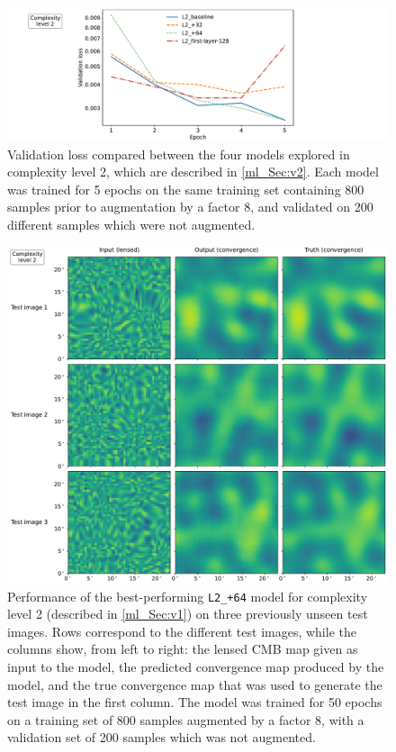 \begin{figure}[tp]
\includegraphics[width=\textwidth]{v2_loss}
\caption{Validation loss compared between the four models explored in complexity level 2, which are described in \autoref{ml_Sec:v2}. Each model was trained for 5 epochs on the same training set containing 800 samples prior to augmentation by a factor 8, and validated on 200 different samples which were not augmented.}
\label{ml_Fig:v2_loss}
\end{figure}

\begin{figure}[tp]
\includegraphics[width=\textwidth]{v2_3x3}
\caption{Performance of the best-performing \texttt{L2\_+64} model for complexity level 2 (described in \autoref{ml_Sec:v1}) on three previously unseen test images. Rows correspond to the different test images, while the columns show, from left to right: the lensed CMB map given as input to the model, the predicted convergence map produced by the model, and the true convergence map that was used to generate the test image in the first column. The model was trained for 50 epochs on a training set of 800 samples augmented by a factor 8, with a validation set of 200 samples which was not augmented.}
\label{ml_Fig:v2_3x3}
\end{figure}

